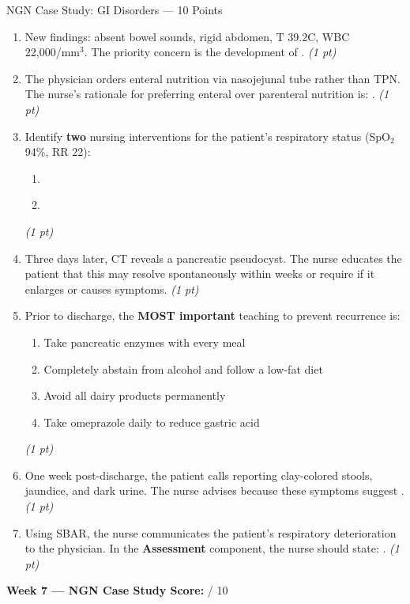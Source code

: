 \documentclass[11pt,letterpaper]{article}
\newcommand{\blank}[1][3cm]{\underline{\hspace{#1}}}
\begin{document}
\begin{diagbox}{NGN Case Study: GI Disorders --- 10 Points}
\begin{enumerate}[leftmargin=1.5em, label=\textbf{\arabic*.},start=61]
  \item New findings: absent bowel sounds, rigid abdomen, T 39.2\textdegree C,
        WBC 22{,}000/mm$^3$.  The priority concern is the development of
        \blank[5cm].
        \hfill\textit{(1 pt)}

  \item The physician orders enteral nutrition via nasojejunal tube rather than TPN.
        The nurse's rationale for preferring enteral over parenteral nutrition is:
        \blank[6cm].
        \hfill\textit{(1 pt)}

  \item Identify \textbf{two} nursing interventions for the patient's respiratory
        status (SpO$_2$ 94\%, RR 22):
        \begin{enumerate}[label=\alph*.]
          \item \blank[7cm]
          \item \blank[7cm]
        \end{enumerate}
        \hfill\textit{(1 pt)}

  \item Three days later, CT reveals a pancreatic pseudocyst.  The nurse educates
        the patient that this may resolve spontaneously within \blank[2cm] weeks
        or require \blank[4cm] if it enlarges or causes symptoms.
        \hfill\textit{(1 pt)}

  \item Prior to discharge, the \textbf{MOST important} teaching to prevent
        recurrence is:
        \begin{enumerate}[label=$\bigcirc$]
          \item Take pancreatic enzymes with every meal
          \item Completely abstain from alcohol and follow a low-fat diet
          \item Avoid all dairy products permanently
          \item Take omeprazole daily to reduce gastric acid
        \end{enumerate}
        \hfill\textit{(1 pt)}

  \item One week post-discharge, the patient calls reporting clay-colored stools,
        jaundice, and dark urine.  The nurse advises \blank[5cm] because
        these symptoms suggest \blank[4cm].
        \hfill\textit{(1 pt)}

  \item Using SBAR, the nurse communicates the patient's respiratory deterioration
        to the physician.  In the \textbf{Assessment} component, the nurse should
        state: \blank[8cm].
        \hfill\textit{(1 pt)}

\end{enumerate}

\vspace{0.3cm}
\textbf{Week 7 --- NGN Case Study Score:} \blank[1cm] / 10
\end{diagbox}
\end{document}
